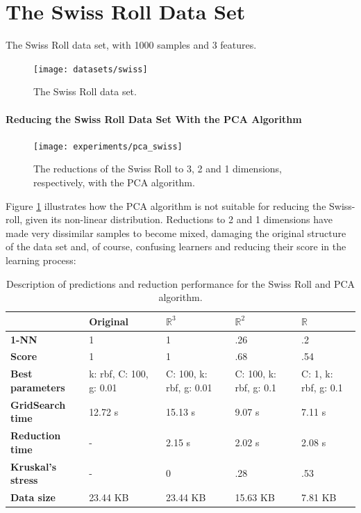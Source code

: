 \clearpage
\section{The Swiss Roll Data Set}

The Swiss Roll data set, with 1000 samples and 3 features.
\newline\newline

\begin{figure}[H]
	\centering
	\texttt{[image: datasets/swiss]}
	\captionsetup{justification=centering}
	\caption{The Swiss Roll data set.}
\end{figure}

\newpage
\paragraph{Reducing the Swiss Roll Data Set With the PCA Algorithm}

\begin{figure}[H]
	\centering
	\captionsetup{justification=centering}
	\texttt{[image: experiments/pca\_swiss]}
	\caption{The reductions of the Swiss Roll to 3, 2 and 1 dimensions, respectively, with the PCA algorithm.}
	\label{fig:dsswisspca}
\end{figure}

Figure \ref{fig:dsswisspca} illustrates how the PCA algorithm is not suitable for reducing the Swiss-roll, given its non-linear distribution. Reductions to 2 and 1 dimensions have made very dissimilar samples to become mixed, damaging the original structure of the data set and, of course, confusing learners and reducing their score in the learning process:

\begin{table}[H]
	\centering
	
	\begin{tabular}{|p{.20\linewidth}|p{.15\linewidth}|p{.15\linewidth}|p{.15\linewidth}|p{.15\linewidth}|}
		\hline
		& \textbf{Original} & $\mathbb{R}^3$ & $\mathbb{R}^2$ & $\mathbb{R}$ \\\hline
		\textbf{1-NN} & 1 & 1 & .26 & .2 \\\hline
		\textbf{Score} & 1 & 1 & .68 & .54 \\\hline
		\textbf{Best parameters} & k: rbf, C: 100, g: 0.01 & C: 100, k: rbf, g: 0.01 & C: 100, k: rbf, g: 0.1 & C: 1, k: rbf, g: 0.1\\\hline
		\textbf{GridSearch time} & 12.72 s & 15.13 s & 9.07 s & 7.11 s \\\hline
		\textbf{Reduction time} & - & 2.15 s & 2.02 s & 2.08 s\\\hline
		\textbf{Kruskal's stress} & - & 0 & .28 & .53 \\\hline
		\textbf{Data size} & 23.44 KB & 23.44 KB & 15.63 KB & 7.81 KB \\\hline
	\end{tabular}
	\captionsetup{justification=centering}
	\caption{Description of predictions and reduction performance for the Swiss Roll and PCA algorithm.}
\end{table}

